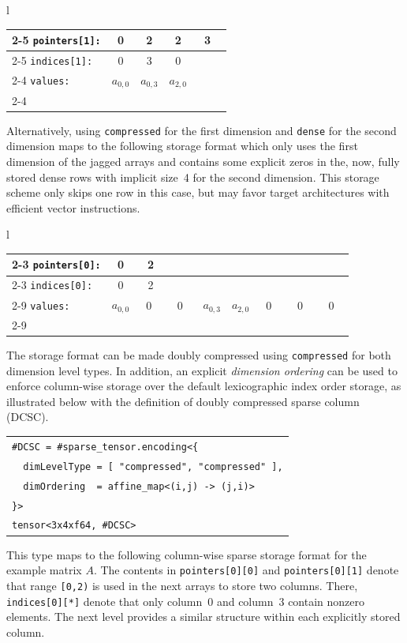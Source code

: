 \documentclass[10pt]{article}
\newcommand{\exam}{\begin{flushleft}\scriptsize\begin{tabular}{l}}
\newcommand{\maxe}{\end{tabular}\end{flushleft}}
\begin{document}
\exam
\begin{tabular}{l|c|c|c|c|}
\cline{2-5}
\texttt{pointers[1]:} & 0 & 2 & 2 & \ 3 \ \\
\cline{2-5}
\texttt{indices[1]:}  & 0 & 3 & 0 \\
\cline{2-4}
\texttt{values:}      & $a_{0,0}$ & $a_{0,3}$ & $a_{2,0}$ \\
\cline{2-4}
\end{tabular}
\maxe

Alternatively, using \texttt{compressed} for the first dimension and \texttt{dense} for the second dimension maps to the following storage format which only uses the first dimension of the jagged arrays and contains some explicit zeros in the, now, fully stored dense rows with implicit size~4 for the second dimension. This storage scheme only skips one row in this case, but may favor target architectures with efficient vector instructions.
\exam
\begin{tabular}{l|c|c|c|c|c|c|c|c|}
\cline{2-3}
\texttt{pointers[0]:} & 0 & 2 \\
\cline{2-3}
\texttt{indices[0]:}  & 0 & 2 \\
\cline{2-9}
\texttt{values:}      & $a_{0,0}$ & \ 0 \ & \ 0 \ & $a_{0,3}$ &
                        $a_{2,0}$ & \ 0 \ & \ 0 \ & \ 0 \ \\
\cline{2-9}
\end{tabular}
\maxe

The storage format can be made doubly compressed using \texttt{compressed} for both dimension level types. In addition, an explicit \emph{dimension ordering} can be used to enforce column-wise storage over the default lexicographic index order storage, as illustrated below with the definition of doubly compressed sparse column (DCSC).

\exam
\verb"#DCSC = #sparse_tensor.encoding<{" \\
\verb+  dimLevelType = [ "compressed", "compressed" ],+ \\
\verb"  dimOrdering  = affine_map<(i,j) -> (j,i)>" \\
\verb"}>" \\
\verb"tensor<3x4xf64, #DCSC>" \\
\maxe
This type maps to the following column-wise sparse storage format for the example matrix $A$. The contents in \texttt{pointers[0][0]} and \texttt{pointers[0][1]} denote that range \texttt{[0,2)} is used in the next arrays to store two columns. There, \texttt{indices[0][*]} denote that only column~0 and column~3 contain nonzero elements. The next level provides a similar structure within each explicitly stored column.
\end{document}
